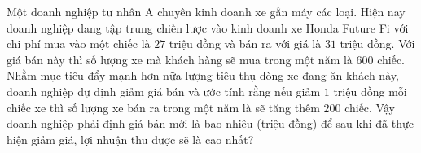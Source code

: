 \begin{ex}%
	Một doanh nghiệp tư nhân A chuyên kinh doanh xe gắn máy các loại. Hiện nay doanh nghiệp dang tập trung chiến lược vào kinh doanh xe Honda Future Fi với chi phí mua vào một chiếc là $27$ triệu đồng và bán ra với giá là $31$ triệu đồng. Với giá bán này thì số lượng xe mà khách hàng sẽ mua trong một năm là $600$ chiếc. Nhằm mục tiêu đẩy mạnh hơn nữa lượng tiêu thụ dòng xe đang ăn khách này, doanh nghiệp dự định giảm giá bán và ước tính rằng nếu giảm $1$ triệu đồng mỗi chiếc xe thì số lượng xe bán ra trong một năm là sẽ tăng thêm $200$ chiếc. Vậy doanh nghiệp phải định giá bán mới là bao nhiêu (triệu đồng) để sau khi đã thực hiện giảm giá, lợi nhuận thu được sẽ là cao nhất?
\end{ex}
